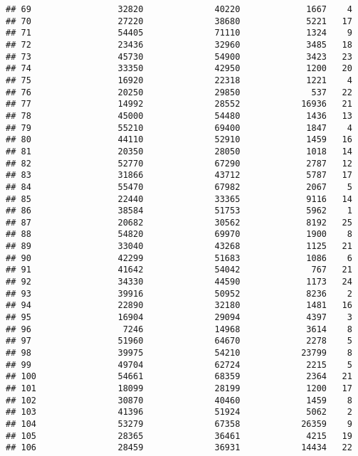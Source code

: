 \documentclass[
]{article}
\begin{document}
\begin{verbatim}
## 69                 32820              40220             1667    4
## 70                 27220              38680             5221   17
## 71                 54405              71110             1324    9
## 72                 23436              32960             3485   18
## 73                 45730              54900             3423   23
## 74                 33350              42950             1200   20
## 75                 16920              22318             1221    4
## 76                 20250              29850              537   22
## 77                 14992              28552            16936   21
## 78                 45000              54480             1436   13
## 79                 55210              69400             1847    4
## 80                 44110              52910             1459   16
## 81                 20350              28050             1018   14
## 82                 52770              67290             2787   12
## 83                 31866              43712             5787   17
## 84                 55470              67982             2067    5
## 85                 22440              33365             9116   14
## 86                 38584              51753             5962    1
## 87                 20682              30562             8192   25
## 88                 54820              69970             1900    8
## 89                 33040              43268             1125   21
## 90                 42299              51683             1086    6
## 91                 41642              54042              767   21
## 92                 34330              44590             1173   24
## 93                 39916              50952             8236    2
## 94                 22890              32180             1481   16
## 95                 16904              29094             4397    3
## 96                  7246              14968             3614    8
## 97                 51960              64670             2278    5
## 98                 39975              54210            23799    8
## 99                 49704              62724             2215    5
## 100                54661              68359             2364   21
## 101                18099              28199             1200   17
## 102                30870              40460             1459    8
## 103                41396              51924             5062    2
## 104                53279              67358            26359    9
## 105                28365              36461             4215   19
## 106                28459              36931            14434   22

\end{verbatim}
\end{document}
